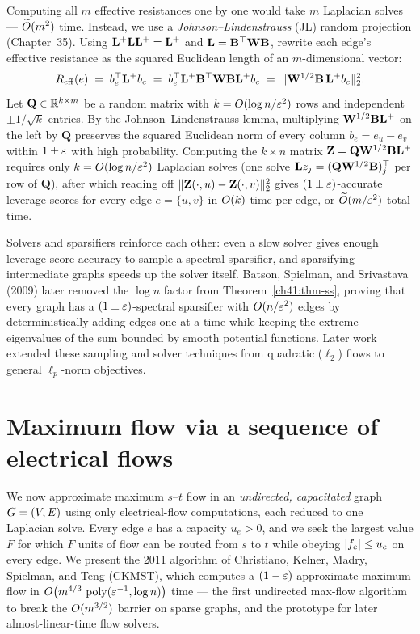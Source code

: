 Computing all $m$ effective resistances one by one would take $m$ Laplacian solves --- $\widetilde{O}(m^2)$ time. Instead, we use a \emph{Johnson--Lindenstrauss} (JL) random projection (Chapter~35). Using $\mathbf{L}^{+}\mathbf{L}\mathbf{L}^{+} = \mathbf{L}^{+}$ and $\mathbf{L} = \mathbf{B}^\top\mathbf{W}\mathbf{B}$, rewrite each edge's effective resistance as the squared Euclidean length of an $m$-dimensional vector:
\[
  R_{\mathrm{eff}}(e) \;=\; b_e^\top \mathbf{L}^{+} b_e \;=\; b_e^\top \mathbf{L}^{+}\mathbf{B}^\top\mathbf{W}\mathbf{B}\mathbf{L}^{+} b_e \;=\; \lVert\mathbf{W}^{1/2}\mathbf{B}\,\mathbf{L}^{+} b_e\rVert_2^2 .
\]
Let $\mathbf{Q} \in \mathbb{R}^{k \times m}$ be a random matrix with $k = O(\log n / \varepsilon^2)$ rows and independent $\pm 1/\sqrt{k}$ entries. By the Johnson--Lindenstrauss lemma, multiplying $\mathbf{W}^{1/2}\mathbf{B}\mathbf{L}^{+}$ on the left by $\mathbf{Q}$ preserves the squared Euclidean norm of every column $b_e = e_u - e_v$ within $1 \pm \varepsilon$ with high probability. Computing the $k \times n$ matrix $\mathbf{Z} = \mathbf{Q}\mathbf{W}^{1/2}\mathbf{B}\mathbf{L}^{+}$ requires only $k = O(\log n / \varepsilon^2)$ Laplacian solves (one solve $\mathbf{L} z_j = (\mathbf{Q}\mathbf{W}^{1/2}\mathbf{B})_j^\top$ per row of $\mathbf{Q}$), after which reading off $\lVert\mathbf{Z}(\cdot, u) - \mathbf{Z}(\cdot, v)\rVert_2^2$ gives $(1\pm\varepsilon)$-accurate leverage scores for every edge $e=\{u,v\}$ in $O(k)$ time per edge, or $\widetilde{O}(m/\varepsilon^2)$ total time.

\begin{connectionbox}
Solvers and sparsifiers reinforce each other: even a slow solver gives enough leverage-score accuracy to sample a spectral sparsifier, and sparsifying intermediate graphs speeds up the solver itself. Batson, Spielman, and Srivastava (2009) later removed the $\log n$ factor from Theorem~\ref{ch41:thm-ss}, proving that every graph has a $(1\pm\varepsilon)$-spectral sparsifier with $O(n/\varepsilon^2)$ edges by deterministically adding edges one at a time while keeping the extreme eigenvalues of the sum bounded by smooth potential functions. Later work extended these sampling and solver techniques from quadratic ($\ell_2$) flows to general $\ell_p$-norm objectives.
\end{connectionbox}

\section{Maximum flow via a sequence of electrical flows}\label{ch41:maxflow}

We now approximate maximum $s$--$t$ flow in an \emph{undirected, capacitated} graph $G = (V,E)$ using only electrical-flow computations, each reduced to one Laplacian solve. Every edge $e$ has a capacity $u_e>0$, and we seek the largest value $F$ for which $F$ units of flow can be routed from $s$ to $t$ while obeying $\lvert f_e\rvert\le u_e$ on every edge. We present the 2011 algorithm of Christiano, Kelner, Madry, Spielman, and Teng (CKMST), which computes a $(1-\varepsilon)$-approximate maximum flow in $O\bigl(m^{4/3}\,\operatorname{poly}(\varepsilon^{-1},\log n)\bigr)$ time --- the first undirected max-flow algorithm to break the $O(m^{3/2})$ barrier on sparse graphs, and the prototype for later almost-linear-time flow solvers.

